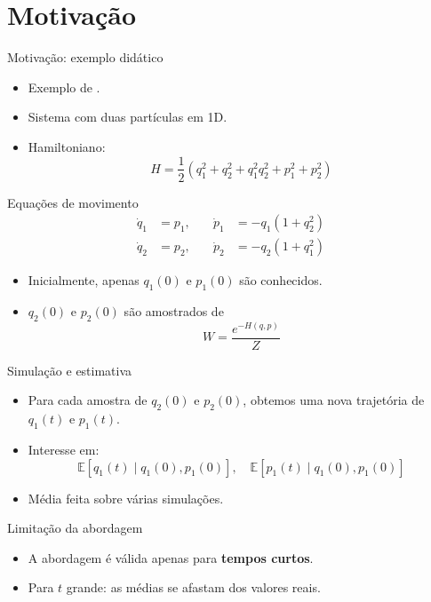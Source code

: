 \section{Motivação} %


\begin{frame}{Motivação: exemplo didático}
\begin{itemize}
    \item Exemplo de \cite{Chorin2013}.
    \item Sistema com duas partículas em 1D.
    \item Hamiltoniano:
    \begin{equation*}
        H = \frac{1}{2}(q_1^2 + q_2^2 + q_1^2 q_2^2 + p_1^2 + p_2^2)
    \end{equation*}
\end{itemize}
\end{frame}

\begin{frame}{Equações de movimento}
\begin{align*}
    \dot{q}_1 &= p_1, \quad &\dot{p}_1 &= -q_1(1 + q_2^2) \\
    \dot{q}_2 &= p_2, \quad &\dot{p}_2 &= -q_2(1 + q_1^2)
\end{align*}
\begin{itemize}
    \item Inicialmente, apenas $q_1(0)$ e $p_1(0)$ são conhecidos.
    \item $q_2(0)$ e $p_2(0)$ são amostrados de
    \begin{equation*}
        W = \frac{e^{-H(q,p)}}{Z}
    \end{equation*}
\end{itemize}
\end{frame}

\begin{frame}{Simulação e estimativa}
\begin{itemize}
    \item Para cada amostra de $q_2(0)$ e $p_2(0)$, obtemos uma nova trajetória de $q_1(t)$ e $p_1(t)$.
    \item Interesse em:
    \begin{equation*}
        \mathbb{E}[q_1(t)\mid q_1(0), p_1(0)], \quad \mathbb{E}[p_1(t)\mid q_1(0), p_1(0)]
    \end{equation*}
    \item Média feita sobre várias simulações.
\end{itemize}
\end{frame}

\begin{frame}{Limitação da abordagem}
\begin{itemize}
    \item A abordagem  é válida apenas para \textbf{tempos curtos}.
    \item Para $t$ grande: as médias se afastam dos valores reais.
\end{itemize}
\end{frame}